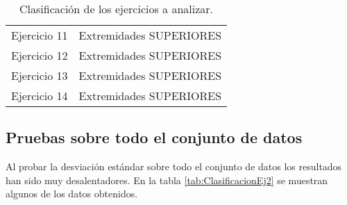 \begin{table}[H]
\begin{tabular}{lc}
\rowcolor[HTML]{ECF4FF} 
Ejercicio 11                                                             & Extremidades SUPERIORES                                             \\
\rowcolor[HTML]{EFEFEF} 
Ejercicio 12                                                             & \multicolumn{1}{c}{\cellcolor[HTML]{EFEFEF}Extremidades SUPERIORES} \\
\rowcolor[HTML]{ECF4FF} 
Ejercicio 13                                                             & \multicolumn{1}{c}{\cellcolor[HTML]{ECF4FF}Extremidades SUPERIORES} \\
\rowcolor[HTML]{EFEFEF} 
Ejercicio 14                                                             & Extremidades SUPERIORES                                             \\ \hline
\end{tabular}
\caption{Clasificación de los ejercicios a analizar.}
\label{tab:ClasificacionEj1}
\end{table}


\subsection{Pruebas sobre todo el conjunto de datos}
Al probar la desviación estándar sobre todo el conjunto de datos los resultados han sido muy desalentadores. En la tabla \ref{tab:ClasificacionEj2} se muestran algunos de los datos obtenidos. 


